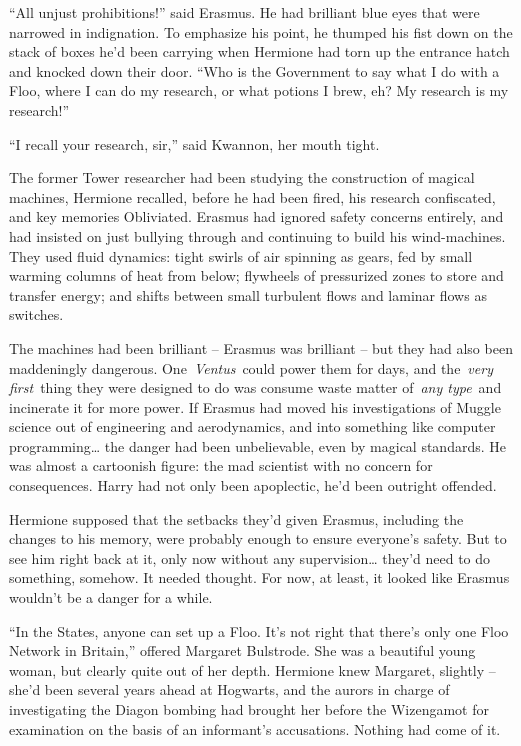 ``All unjust prohibitions!'' said Erasmus. He had brilliant blue eyes
that were narrowed in indignation. To emphasize his point, he thumped
his fist down on the stack of boxes he'd been carrying when Hermione had
torn up the entrance hatch and knocked down their door. ``Who is the
Government to say what I do with a Floo, where I can do my research, or
what potions I brew, eh? My research is my research!''

``I recall your research, sir,'' said Kwannon, her mouth tight.

The former Tower researcher had been studying the construction of
magical machines, Hermione recalled, before he had been fired, his
research confiscated, and key memories Obliviated. Erasmus had ignored
safety concerns entirely, and had insisted on just bullying through and
continuing to build his wind-machines. They used fluid dynamics: tight
swirls of air spinning as gears, fed by small warming columns of heat
from below; flywheels of pressurized zones to store and transfer energy;
and shifts between small turbulent flows and laminar flows as switches.

The machines had been brilliant -- Erasmus was brilliant -- but they had
also been maddeningly dangerous. One~\emph{Ventus}~could power them for
days, and the~\emph{very first}~thing they were designed to do was
consume waste matter of~\emph{any type}~and incinerate it for more
power. If Erasmus had moved his investigations of Muggle science out of
engineering and aerodynamics, and into something like computer
programming\ldots{} the danger had been unbelievable, even by magical
standards. He was almost a cartoonish figure: the mad scientist with no
concern for consequences. Harry had not only been apoplectic, he'd been
outright offended.

Hermione supposed that the setbacks they'd given Erasmus, including the
changes to his memory, were probably enough to ensure everyone's safety.
But to see him right back at it, only now without any
supervision\ldots{} they'd need to do something, somehow. It needed
thought. For now, at least, it looked like Erasmus wouldn't be a danger
for a while.

``In the States, anyone can set up a Floo. It's not right that there's
only one Floo Network in Britain,'' offered Margaret Bulstrode. She was
a beautiful young woman, but clearly quite out of her depth. Hermione
knew Margaret, slightly -- she'd been several years ahead at Hogwarts,
and the aurors in charge of investigating the Diagon bombing had brought
her before the Wizengamot for examination on the basis of an informant's
accusations. Nothing had come of it.

